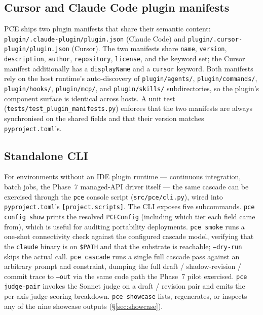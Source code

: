 \subsection{Cursor and Claude Code plugin manifests}

PCE ships two plugin manifests that share their semantic content: \texttt{plugin/.claude-plugin/plugin.json} (Claude Code) and \texttt{plugin/.cursor-plugin/plugin.json} (Cursor). The two manifests share \texttt{name}, \texttt{version}, \texttt{description}, \texttt{author}, \texttt{repository}, \texttt{license}, and the keyword set; the Cursor manifest additionally has a \texttt{displayName} and a \texttt{cursor} keyword. Both manifests rely on the host runtime's auto-discovery of \texttt{plugin/agents/}, \texttt{plugin/commands/}, \texttt{plugin/hooks/}, \texttt{plugin/mcp/}, and \texttt{plugin/skills/} subdirectories, so the plugin's component surface is identical across hosts. A unit test (\texttt{tests/test\_plugin\_manifests.py}) enforces that the two manifests are always synchronised on the shared fields and that their version matches \texttt{pyproject.toml}'s.

\subsection{Standalone CLI}

For environments without an IDE plugin runtime --- continuous integration, batch jobs, the Phase~7 managed-API driver itself --- the same cascade can be exercised through the \texttt{pce} console script (\texttt{src/pce/cli.py}), wired into \texttt{pyproject.toml}'s \texttt{[project.scripts]}. The CLI exposes five subcommands. \texttt{pce config show} prints the resolved \texttt{PCEConfig} (including which tier each field came from), which is useful for auditing portability deployments. \texttt{pce smoke} runs a one-shot connectivity check against the configured cascade model, verifying that the \texttt{claude} binary is on \texttt{\$PATH} and that the substrate is reachable; \texttt{--dry-run} skips the actual call. \texttt{pce cascade} runs a single full cascade pass against an arbitrary prompt and constraint, dumping the full draft / shadow-revision / commit trace to \texttt{--out} via the same code path the Phase~7 pilot exercised. \texttt{pce judge-pair} invokes the Sonnet judge on a draft / revision pair and emits the per-axis judge-scoring breakdown. \texttt{pce showcase} lists, regenerates, or inspects any of the nine showcase outputs (\S\ref{sec:showcase}).

